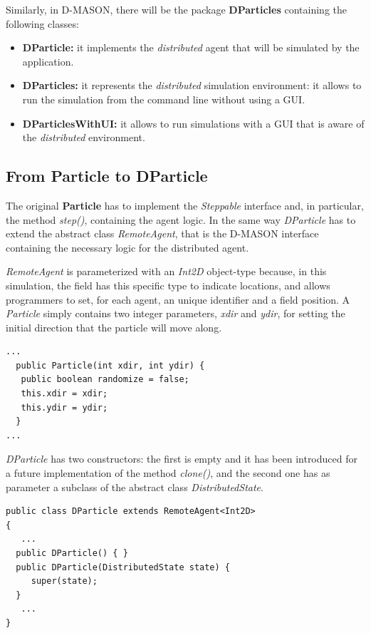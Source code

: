 \documentclass[12pt]{article}
\begin{document}
Similarly, in D-MASON, there will be the package \textbf{DParticles} containing the following classes:

\begin{itemize}
	\item \textbf{DParticle:} it implements the \textit{distributed} agent that will be simulated by the application.
	\item \textbf{DParticles:} it represents the \textit{distributed} simulation environment: it allows to run the simulation from the command line without using a GUI.
	\item \textbf{DParticlesWithUI:} it allows to run simulations with a GUI that is aware of the \textit{distributed} environment.
\end{itemize}

\subsection{From Particle to DParticle}
The original \textbf{Particle} has to implement the \textit{Steppable} interface and, in particular, the method \textit{step()}, containing the agent logic. In the same way \textit{DParticle} has to extend the abstract class \textit{RemoteAgent}, that is the D-MASON interface containing the necessary logic for the distributed agent. 

\textit{RemoteAgent} is parameterized with an \textit{Int2D} object-type because, in this simulation, the field has this specific type to indicate locations, and allows programmers to set, for each agent, an unique identifier and a field position.
A \textit{Particle} simply contains two integer parameters, \textit{xdir} and \textit{ydir}, for setting the initial direction that the particle will move along.

\begin{lstlisting}
...
  public Particle(int xdir, int ydir) {
   public boolean randomize = false;
   this.xdir = xdir;
   this.ydir = ydir;
  }
...
\end{lstlisting}
\medskip

\textit{DParticle} has two constructors: the first is empty and it has been introduced for a future implementation of the method \textit{clone()}, and the second one has as parameter a subclass of the abstract class \textit{DistributedState}.

\begin{lstlisting}
public class DParticle extends RemoteAgent<Int2D>
{
   ...
  public DParticle() { }
  public DParticle(DistributedState state) {
     super(state);
  }
   ...
}
\end{lstlisting}
\end{document}
